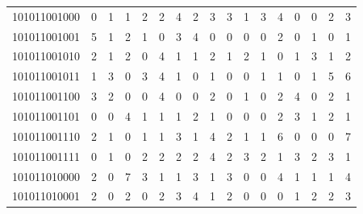 \documentclass[10pt,a4paper]{article}
\begin{document}
\begin{longtable}{ |c|c|c|c|c|c|c|c|c|c|c|c|c|c|c|c|c| }
    101011001000              & 0                            & 1                                & 1                            & 2                              & 2   & 4   & 2   & 3   & 3   & 1   & 3   & 4   & 0   & 0   & 2   & 3   \\
    101011001001              & 5                            & 1                                & 2                            & 1                              & 0   & 3   & 4   & 0   & 0   & 0   & 0   & 2   & 0   & 1   & 0   & 1   \\
    101011001010              & 2                            & 1                                & 2                            & 0                              & 4   & 1   & 1   & 2   & 1   & 2   & 1   & 0   & 1   & 3   & 1   & 2   \\
    101011001011              & 1                            & 3                                & 0                            & 3                              & 4   & 1   & 0   & 1   & 0   & 0   & 1   & 1   & 0   & 1   & 5   & 6   \\
    101011001100              & 3                            & 2                                & 0                            & 0                              & 4   & 0   & 0   & 2   & 0   & 1   & 0   & 2   & 4   & 0   & 2   & 1   \\
    101011001101              & 0                            & 0                                & 4                            & 1                              & 1   & 1   & 2   & 1   & 0   & 0   & 0   & 2   & 3   & 1   & 2   & 1   \\
    101011001110              & 2                            & 1                                & 0                            & 1                              & 1   & 3   & 1   & 4   & 2   & 1   & 1   & 6   & 0   & 0   & 0   & 7   \\
    101011001111              & 0                            & 1                                & 0                            & 2                              & 2   & 2   & 2   & 4   & 2   & 3   & 2   & 1   & 3   & 2   & 3   & 1   \\
    101011010000              & 2                            & 0                                & 7                            & 3                              & 1   & 1   & 3   & 1   & 3   & 0   & 0   & 4   & 1   & 1   & 1   & 4   \\
    101011010001              & 2                            & 0                                & 2                            & 0                              & 2   & 3   & 4   & 1   & 2   & 0   & 0   & 0   & 1   & 2   & 2   & 3   \\

\end{longtable}
\end{document}
